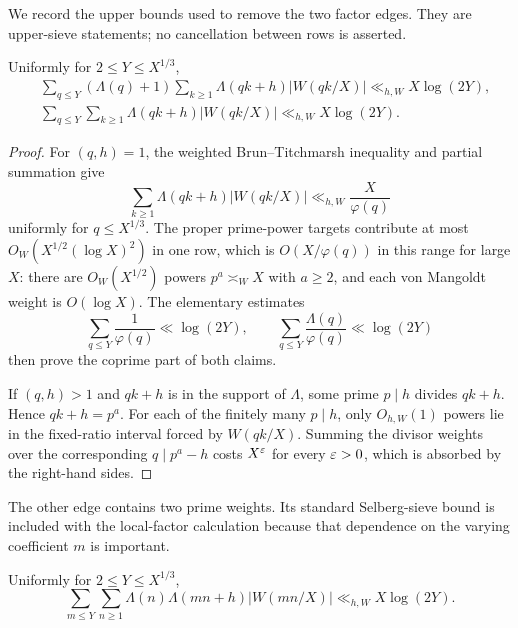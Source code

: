 We record the upper bounds used to remove the two factor edges.  They are
upper-sieve statements; no cancellation between rows is asserted.

\begin{lemma}
\label{lem:one-prime-edge}
Uniformly for $2\leq Y\leq X^{1/3}$,
\begin{align}
 &\sum_{q\leq Y}(\Lambda(q)+1)
   \sum_{k\geq1}\Lambda(qk+h)|W(qk/X)|
 \ll_{h,W}X\log(2Y),
 \label{eq:one-prime-q-edge}\\
 &\sum_{q\leq Y}
   \sum_{k\geq1}\Lambda(qk+h)|W(qk/X)|
 \ll_{h,W}X\log(2Y).
 \label{eq:one-prime-k-edge}
\end{align}
\end{lemma}

\begin{proof}
For $(q,h)=1$, the weighted Brun--Titchmarsh inequality and partial
summation give
\begin{equation}\label{eq:weighted-BT-row}
 \sum_{k\geq1}\Lambda(qk+h)|W(qk/X)|
 \ll_{h,W}\frac{X}{\varphi(q)}
\end{equation}
uniformly for $q\leq X^{1/3}$.  The proper prime-power targets contribute
at most $O_W(X^{1/2}(\log X)^2)$ in one row, which is
$O(X/\varphi(q))$ in this range for large $X$: there are
$O_W(X^{1/2})$ powers $p^a\asymp_W X$ with $a\geq2$, and each von
Mangoldt weight is $O(\log X)$.  The elementary estimates
\begin{equation}\label{eq:phi-harmonic-estimates}
 \sum_{q\leq Y}\frac1{\varphi(q)}\ll\log(2Y),
 \qquad
 \sum_{q\leq Y}\frac{\Lambda(q)}{\varphi(q)}\ll\log(2Y)
\end{equation}
then prove the coprime part of both claims.

If $(q,h)>1$ and $qk+h$ is in the support of $\Lambda$, some prime
$p\mid h$ divides $qk+h$.  Hence $qk+h=p^a$.  For each of the finitely
many $p\mid h$, only $O_{h,W}(1)$ powers lie in the fixed-ratio interval
forced by $W(qk/X)$.  Summing the divisor weights over the corresponding
$q\mid p^a-h$ costs $X^\varepsilon$ for every $\varepsilon>0$, which is absorbed by the
right-hand sides.
\end{proof}

The other edge contains two prime weights.  Its standard Selberg-sieve
bound is included with the local-factor calculation because that
dependence on the varying coefficient $m$ is important.

\begin{lemma}
\label{lem:two-linear-forms-edge}
Uniformly for $2\leq Y\leq X^{1/3}$,
\begin{equation}\label{eq:two-linear-forms-edge}
 \sum_{m\leq Y}\sum_{n\geq1}
 \Lambda(n)\Lambda(mn+h)|W(mn/X)|
 \ll_{h,W}X\log(2Y).
\end{equation}
\end{lemma}

